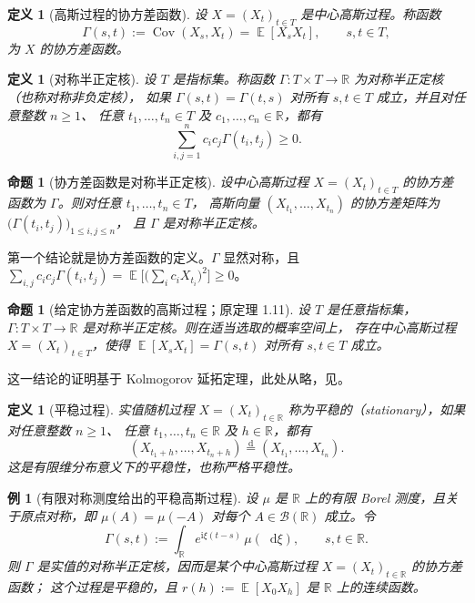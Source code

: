 \documentclass[UTF8,11pt,a4paper,oneside,fontset=fandol]{ctexrep}
\makeatletter
\numberwithin{equation}{section}
\theoremstyle{zhthm}
\newtheorem{proposition}[theorem]{命题}
\newtheorem{definition}[theorem]{定义}
\newtheorem{example}[theorem]{例}
\renewenvironment{proof}[1][\proofname]{\par
  \pushQED{\qed}%
  \normalfont\topsep6\p@\@plus6\p@\relax
  \trivlist
  \item[\hskip\labelsep\bfseries#1\hspace{0.5em}]\ignorespaces
}{%
  \popQED\endtrivlist\@endpefalse
}
\renewcommand{\proofname}{证明}
\newcommand{\R}{\mathbb{R}}
\newcommand{\B}{\mathcal{B}}
\DeclareMathOperator{\E}{\mathbb{E}}
\DeclareMathOperator{\Cov}{Cov}
\newcommand{\iu}{\mathrm{i}}
\newcommand{\deq}{\overset{\mathrm{d}}{=}}
\newcommand{\dd}{\mathop{}\!\mathrm{d}}
\makeatother
\begin{document}
\begin{definition}[高斯过程的协方差函数]
\label{def:gaussian-process-covariance}
设 $X=(X_t)_{t\in T}$ 是中心高斯过程。称函数
\[
  \Gamma(s,t):=\Cov(X_s,X_t)=\E[X_sX_t],\qquad s,t\in T,
\]
为 $X$ 的协方差函数。
\end{definition}

\begin{definition}[对称半正定核]
\label{def:symmetric-positive-kernel}
设 $T$ 是指标集。称函数 $\Gamma:T\times T\to\R$ 为对称半正定核（也称对称非负定核），
如果 $\Gamma(s,t)=\Gamma(t,s)$ 对所有 $s,t\in T$ 成立，并且对任意整数 $n\ge1$、
任意 $t_1,\ldots,t_n\in T$ 及 $c_1,\ldots,c_n\in\R$，都有
\[
  \sum_{i,j=1}^{n}c_ic_j\Gamma(t_i,t_j)\ge0.
\]
\end{definition}

\begin{proposition}[协方差函数是对称半正定核]
\label{prop:gaussian-process-finite-covariance}
设中心高斯过程 $X=(X_t)_{t\in T}$ 的协方差函数为 $\Gamma$。则对任意 $t_1,\ldots,t_n\in T$，
高斯向量 $(X_{t_1},\ldots,X_{t_n})$ 的协方差矩阵为 $\bigl(\Gamma(t_i,t_j)\bigr)_{1\le i,j\le n}$，
且 $\Gamma$ 是对称半正定核。
\end{proposition}

\begin{proof}
第一个结论就是协方差函数的定义。$\Gamma$ 显然对称，且
$\sum_{i,j}c_ic_j\Gamma(t_i,t_j)=\E\bigl[\bigl(\sum_ic_iX_{t_i}\bigr)^2\bigr]\ge0$。
\end{proof}

\begin{proposition}[给定协方差函数的高斯过程；原定理 1.11]
\label{prop:gaussian-process-covariance-existence}
设 $T$ 是任意指标集，$\Gamma:T\times T\to\R$ 是对称半正定核。则在适当选取的概率空间上，
存在中心高斯过程 $X=(X_t)_{t\in T}$，使得 $\E[X_sX_t]=\Gamma(s,t)$ 对所有 $s,t\in T$ 成立。
\end{proposition}

这一结论的证明基于 Kolmogorov 延拓定理，此处从略，见\cite[定理 1.11]{LeGall2016}。

\begin{definition}[平稳过程]
\label{def:stationary-process}
实值随机过程 $X=(X_t)_{t\in\R}$ 称为平稳的（stationary），如果对任意整数 $n\ge1$、
任意 $t_1,\ldots,t_n\in\R$ 及 $h\in\R$，都有
\[
  (X_{t_1+h},\ldots,X_{t_n+h})\deq(X_{t_1},\ldots,X_{t_n}).
\]
这是有限维分布意义下的平稳性，也称严格平稳性。
\end{definition}

\begin{example}[有限对称测度给出的平稳高斯过程]
\label{ex:stationary-gaussian-spectral-measure}
设 $\mu$ 是 $\R$ 上的有限 Borel 测度，且关于原点对称，即 $\mu(A)=\mu(-A)$ 对每个 $A\in\B(\R)$ 成立。令
\begin{equation}
  \label{eq:stationary-gaussian-spectral-kernel}
  \Gamma(s,t):=\int_{\R}e^{\iu\xi(t-s)}\,\mu(\dd\xi),\qquad s,t\in\R.
\end{equation}
则 $\Gamma$ 是实值的对称半正定核，因而是某个中心高斯过程 $X=(X_t)_{t\in\R}$ 的协方差函数；
这个过程是平稳的，且 $r(h):=\E[X_0X_h]$ 是 $\R$ 上的连续函数。
\end{example}
\end{document}
